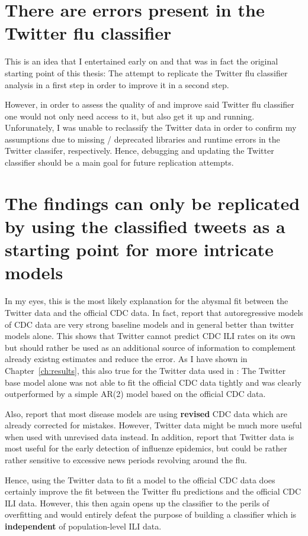 \documentclass[11pt, a4paper,twoside]{report}\usepackage[]{graphicx}\usepackage[]{color}
\begin{document}
\section{There are errors present in the Twitter flu classifier}
This is an idea that I entertained early on and that was in fact the original starting point of this thesis: The attempt to replicate the Twitter flu classifier analysis in a first step in order to improve it in a second step.

However, in order to assess the quality of and improve said Twitter flu classifier one would not only need access to it, but also get it up and running. Unforunately, I was unable to reclassify the Twitter data in order to confirm my assumptions due to missing / deprecated libraries and runtime errors in the Twitter classifer, respectively. Hence, debugging and updating the Twitter classifier should be a main goal for future replication attempts.

\section{The findings can only be replicated by using the classified tweets as a starting point for more intricate models}
In my eyes, this is the most likely explanation for the abysmal fit between the Twitter data and the official CDC data. In fact, \citep{paul_worldwide_2015} report that autoregressive models of CDC data are very strong baseline models and in general better than twitter models alone. This shows that Twitter cannot predict CDC ILI rates on its own but should rather be used as an additional source of information to complement already existng estimates and reduce the error. As I have shown in Chapter~\ref{ch:results}, this also true for the Twitter data used in \citep{bodnar_data_2015}: The Twitter base model alone was not able to fit the official CDC data tightly and was clearly outperformed by a simple AR(2) model based on the official CDC data. 

Also, \citep{paul_twitter_2014} report that most disease models are using \textbf{revised} CDC data which are already corrected for mistakes. However, Twitter data might be much more useful when used with unrevised data instead. In addition, \citep{aramaki_twitter_2011} report that Twitter data is most useful for the early detection of influenze epidemics, but could be rather rather sensitive to excessive news periods revolving around the flu.

Hence, using the Twitter data to fit a model to the official CDC data does certainly improve the fit between the Twitter flu predictions and the official CDC ILI data. However, this then again opens up the classifier to the perils of overfitting and would entirely defeat the purpose of building a classifier which is \textbf{independent} of population-level ILI data. 
\end{document}
